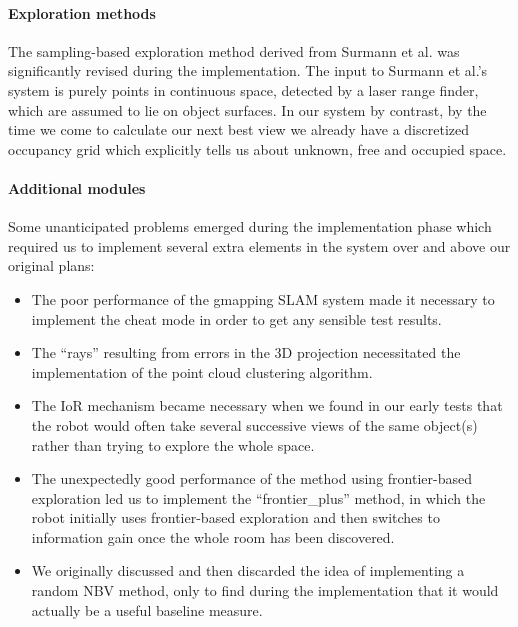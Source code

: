 
\paragraph{Exploration methods} %
\label{par:exploration_methods}

The sampling-based exploration method derived from Surmann et al. \cite{surmann2003autonomous} was significantly revised during the implementation.
The input to Surmann et al.'s system is purely points in continuous space, detected by a laser range finder, which are assumed to lie on object surfaces.
In our system by contrast, by the time we come to calculate our next best view we already have a discretized occupancy grid which explicitly tells us about unknown, free and occupied space.


\paragraph{Additional modules} %
\label{par:additional_modules}

Some unanticipated problems emerged during the implementation phase which required us to implement several extra elements in the system over and above our original plans:

\begin{itemize}
	\item The poor performance of the gmapping SLAM system made it necessary to implement the cheat mode in order to get any sensible test results.
	\item The ``rays'' resulting from errors in the 3D projection necessitated the implementation of the point cloud clustering algorithm.
	\item The IoR mechanism became necessary when we found in our early tests that the robot would often take several successive views of the same object(s) rather than trying to explore the whole space.
	\item The unexpectedly good performance of the method using frontier-based exploration led us to implement the ``frontier\_plus'' method, in which the robot initially uses frontier-based exploration and then switches to information gain once the whole room has been discovered.
	\item We originally discussed and then discarded the idea of implementing a random NBV method, only to find during the implementation that it would actually be a useful baseline measure.
\end{itemize}

